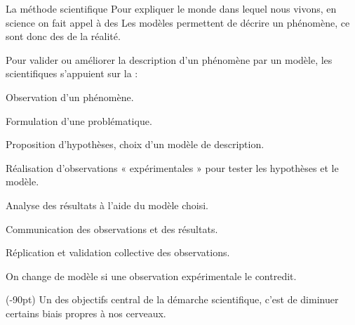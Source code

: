 \begin{doc}{La méthode scientifique}
  Pour expliquer le monde dans lequel nous vivons, en science on fait appel à des  
  Les modèles permettent de décrire un phénomène, ce sont donc des  de la réalité.

  Pour valider ou améliorer la description d'un phénomène par un modèle, les scientifiques s'appuient sur la  :
  \begin{enumeration}
    \item Observation d'un phénomène.
    \item Formulation d'une problématique.
    \item Proposition d'hypothèses, choix d'un modèle de description.
    \item Réalisation d'observations « expérimentales » pour tester les hypothèses et le modèle.
    \item Analyse des résultats à l'aide du modèle choisi.
    \item Communication des observations et des résultats.
    \item Réplication et validation collective des observations.
  \end{enumeration}

  \flecheLongue On change de modèle si une observation expérimentale le contredit.
  \bigskip

  (-90pt)
  Un des objectifs central de la démarche scientifique, c'est de diminuer certains biais propres à nos cerveaux.
\end{doc}


